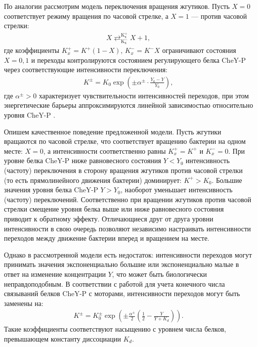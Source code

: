 По аналогии рассмотрим модель переключения вращения жгутиков. Пусть $X = 0$ соответствует режиму вращения по часовой стрелке, а $X = 1$ — против часовой стрелки:
\begin{equation}
    \begin{aligned}
        X \mathrel{\mathop{\rightleftarrows}^{\mathrm{K_{x}^{+}}}_{\mathrm{K_{x}^{-}}}} X + 1,
    \label{eq:turning}
    \end{aligned}
\end{equation}
где коэффициенты $K_x^{+}=K^{+}(1-X)$, $K_x^{-}=K^{-}X$ ограничивают состояния $X={0, 1}$ и переходы контролируются состоянием регулирующего белка CheY-P через соответствующие интенсивности переключения:
\begin{equation}
    \begin{aligned}
        K^{\pm}=K_0 \exp \left (\pm\alpha^\pm \cdot \frac{Y_0-Y}{Y_0} \right ),
    \label{eq:turning-rates}
    \end{aligned}
\end{equation}
где $\alpha^\pm>0$ характеризует чувствительности интенсивностей переходов, при этом энергетические барьеры аппроксимируются линейной зависимостью относительно уровня CheY-P \cite{khan_steady-state_1980}.

Опишем качественное поведение предложенной модели. Пусть жгутики вращаются по часовой стрелке, что соответствует вращению бактерии на одном месте: $X=0$, а интенсивности соответственно равны $K_x^{+}=K^{+}$ и $K_x^{-}=0$. При уровне белка CheY-P ниже равновесного состояния $Y<Y_0$ интенсивность (частоту) переключения в сторону вращения жгутиков против часовой стрелки (то есть прямолинейного движения бактерии) доминирует: $K^{+}>K_0$. Большие значения уровня белка CheY-P $Y>Y_0$, наоборот уменьшает интенсивность (частоту) переключений. Соответственно при вращении жгутиков против часовой стрелки смещение уровня белка выше или ниже равновесного состояния приводит к обратному эффекту. Отличающиеся друг от друга уровни интенсивности в свою очередь позволяют независимо настраивать интенсивности переходов между движение бактерии вперед и вращением на месте.

Однако в рассмотренной модели есть недостаток: интенсивности переходов могут принимать значения экспоненциально большие или экспоненциально малые в ответ на изменение концентрации $Y$, что может быть биологически неправдоподобным. В соответствии с работой \cite{frankel_adaptability_2014} для учета конечного числа связываний белков CheY-P с моторами, интенсивности переходов могут быть заменены на:
\begin{equation}
    \begin{aligned}
        K^{\pm}=K_0^{\pm} \exp \left (\pm\frac{\alpha^\pm}{2} \left (\frac{1}{2} - \frac{Y}{Y+K_d} \right ) \right ).
    \label{eq:turning-rates-kd}
    \end{aligned}
\end{equation}
Такие коэффициенты соответствуют насыщению с уровнем числа белков, превышающем константу диссоциации $K_d$.


